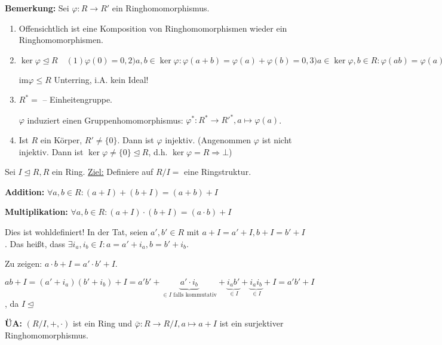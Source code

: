 \documentclass[10pt,a4paper]{article}
\begin{document}
\textbf{Bemerkung:} Sei $\varphi : R \to R'$ ein Ringhomomorphismus.\begin{enumerate} 
\item Offensichtlich ist eine Komposition von Ringhomomorphismen wieder ein Ringhomomorphismen. 
\item $\ker \varphi \trianglelefteq R \quad (1) \varphi(0) = 0, 2) a,b \in \ker \varphi: \varphi(a+b) = \varphi(a) + \varphi(b) = 0, 3) a \in \ker \varphi, b \in R: \varphi (ab) = \varphi(a) \varphi(b) = 0 \cdot \varphi(b) = 0)$

im$\varphi \leqslant R$ Unterring, i.A. kein Ideal!

\item $R^* =$ -- Einheitengruppe.

$\varphi$ induziert einen Gruppenhomomorphismus: $\varphi^*: R^* \to {R'}^*, a \mapsto \varphi(a)$.

\item Ist $R$ ein Körper, $R' \neq \{0\}$. Dann ist $\varphi$ injektiv. (Angenommen $\varphi$ ist nicht injektiv. Dann ist $\ker \varphi \neq \{0\} \trianglelefteq R$, d.h. $\ker \varphi = R \Rightarrow \bot$)
\end{enumerate}

Sei $I \trianglelefteq R, R$ ein Ring. \underline{Ziel:} Definiere auf $R / I = $  eine Ringstruktur.

\textbf{Addition:} $\forall a,b \in R: (a+I) + (b+I) = (a+b)+I$

\textbf{Multiplikation:} $\forall a,b \in R: (a+I) \cdot (b+I) = (a\cdot b)+I$

Dies ist wohldefiniert! In der Tat, seien $a', b' \in R$ mit $a+I = a' + I, b+I = b' + I$. Das heißt, dass $\exists i_a, i_b \in I: a = a' + i_a, b = b' + i_b.$ 

Zu zeigen: $a \cdot b + I = a' \cdot b' + I$.

$ab+I = (a' + i_a) (b' + i_b) + I = a'b' + \underbrace{a' \cdot i_b}_{\in I \text{ falls kommutativ}} + \underbrace{i_a b'}_{\in I} + \underbrace{i_a i_b}_{\in I} + I = a'b' + I$, da $I \trianglelefteq$

\textbf{ÜA:} $(R/I, +, \cdot)$ ist ein Ring und $\bar{\varphi}: R \to R/I, a \mapsto a + I$ ist ein surjektiver Ringhomomorphismus.
\end{document}

